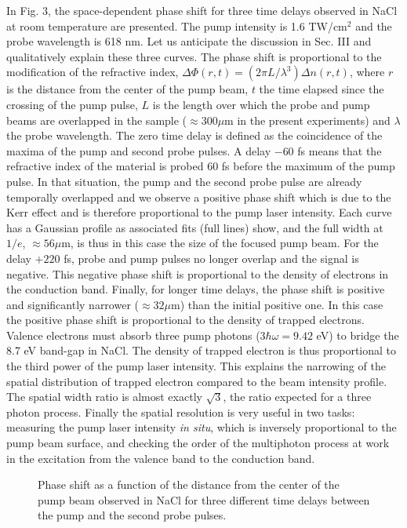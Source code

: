 \documentclass[aps,prb,reprint]{revtex4-2}
\begin{document}
In Fig. 3, the space-dependent phase shift for three time delays observed in NaCl at room temperature are presented. The pump intensity is 1.6 TW/cm$^2$ and the probe wavelength is 618 nm. Let us anticipate the discussion in Sec. III and qualitatively explain these three curves. The phase shift is proportional to the modification of the refractive index, $\Delta \Phi(r, t) = (2\pi L / \lambda^3) \Delta n(r, t)$, where $r$ is the distance from the center of the pump beam, $t$ the time elapsed since the crossing of the pump pulse, $L$ is the length over which the probe and pump beams are overlapped in the sample ($\approx 300 \mu$m in the present experiments) and $\lambda$ the probe wavelength. The zero time delay is defined as the coincidence of the maxima of the pump and second probe pulses. A delay $-60$ fs means that the refractive index of the material is probed 60 fs before the maximum of the pump pulse. In that situation, the pump and the second probe pulse are already temporally overlapped and we observe a positive phase shift which is due to the Kerr effect and is therefore proportional to the pump laser intensity. Each curve has a Gaussian profile as associated fits (full lines) show, and the full width at $1/e$, $\approx 56 \mu$m, is thus in this case the size of the focused pump beam. For the delay $+220$ fs, probe and pump pulses no longer overlap and the signal is negative. This negative phase shift is proportional to the density of electrons in the conduction band. Finally, for longer time delays, the phase shift is positive and significantly narrower ($\approx 32 \mu$m) than the initial positive one. In this case the positive phase shift is proportional to the density of trapped electrons. Valence electrons must absorb three pump photons ($3\hbar\omega = 9.42$ eV) to bridge the 8.7 eV band-gap in NaCl. The density of trapped electron is thus proportional to the third power of the pump laser intensity. This explains the narrowing of the spatial distribution of trapped electron compared to the beam intensity profile. The spatial width ratio is almost exactly $\sqrt{3}$, the ratio expected for a three photon process. Finally the spatial resolution is very useful in two tasks: measuring the pump laser intensity \textit{in situ}, which is inversely proportional to the pump beam surface, and checking the order of the multiphoton process at work in the excitation from the valence band to the conduction band.

\begin{figure}[ht]
    \centering
    \caption{Phase shift as a function of the distance from the center of the pump beam observed in NaCl for three different time delays between the pump and the second probe pulses.}
    \label{fig:nacl_phaseshift}
\end{figure}
\end{document}
